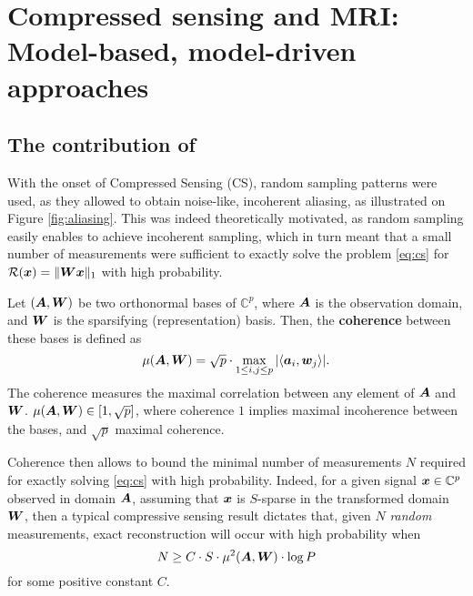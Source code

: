 
\section{Compressed sensing and MRI: Model-based, model-driven approaches}
\subsection{The contribution of \texorpdfstring{\citet{lustig2007sparse}}{Lustig et al. (2007)}}
With the onset of Compressed Sensing (CS), random sampling patterns were used, as they allowed to obtain noise-like, incoherent aliasing, as illustrated on Figure \ref{fig:aliasing}. This was indeed theoretically motivated, as random sampling easily enables to achieve incoherent sampling, which in turn meant that a small number of measurements were sufficient to exactly solve the problem \ref{eq:cs} for $\mathcal{R}({\bm{x}}) = \|{\bm{W}}{\bm{x}}\|_1$ with high probability. 


\begin{definition}
    Let $({\bm{A}}, {\bm{W}})$ be two orthonormal bases of $\mathbb{C}^p$, where ${\bm{A}}$ is the observation domain, and ${\bm{W}}$ is the sparsifying (representation) basis. Then, the \textbf{coherence} between these bases is defined as \citep{candes2008introduction}
    \begin{equation}
        \mu({\bm{A}},{\bm{W}}) = \sqrt{p} \cdot \max_{1\leq i,j \leq p} |\langle {\bm{a}}_i, {\bm{w}}_j \rangle|.
    \end{equation}
    The coherence measures the maximal correlation between any element of ${\bm{A}}$ and ${\bm{W}}$. $\mu({\bm{A}},{\bm{W}}) \in [1, \sqrt{p}]$, where coherence $1$ implies maximal incoherence between the bases, and $\sqrt{p}$ maximal coherence. 
\end{definition}


Coherence then allows to bound the minimal number of measurements $N$ required for exactly solving \ref{eq:cs} with high probability. Indeed, for a given signal ${\bm{x}} \in \mathbb{C}^p$ observed in domain ${\bm{A}}$, assuming that ${\bm{x}}$ is $S$-sparse in the transformed domain ${\bm{W}}$, then a typical compressive sensing result \citep{candes2007sparsity} dictates that, given $N$ \textit{random} measurements, exact reconstruction will occur with high probability when 
\begin{equation}
    N \geq C \cdot S\cdot \mu^2({\bm{A}}, {\bm{W}}) \cdot \log P \label{eq:n_measurement}
\end{equation}    
for some positive constant $C$. 

